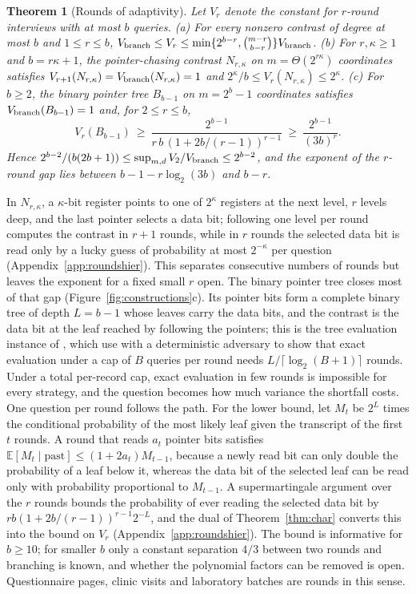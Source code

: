\documentclass{article}
\newtheorem{theorem}{Theorem}
\newcommand{\E}{\mathbb{E}}
\begin{document}
\begin{theorem}[Rounds of adaptivity]\label{thm:rounds}
Let $V_r$ denote the constant for $r$-round interviews with at most $b$ queries.
\textup{(a)} For every nonzero contrast of degree at most $b$ and $1\le r\le b$,
$V_{\rm branch}\le V_r\le\min\{2^{b-r},\binom{m-r}{b-r}\}V_{\rm branch}$.
\textup{(b)} For $r,\kappa\ge1$ and $b=r\kappa+1$, the pointer-chasing contrast $N_{r,\kappa}$ on $m=\Theta(2^{r\kappa})$ coordinates satisfies $V_{r+1}(N_{r,\kappa})=V_{\rm branch}(N_{r,\kappa})=1$ and $2^\kappa/b\le V_r(N_{r,\kappa})\le2^\kappa$.
\textup{(c)} For $b\ge2$, the binary pointer tree $B_{b-1}$ on $m=2^b-1$ coordinates satisfies $V_{\rm branch}(B_{b-1})=1$ and, for $2\le r\le b$,
\[
 V_r(B_{b-1})\ \ge\ \frac{2^{b-1}}{r\,b\,(1+2b/(r-1))^{r-1}}\ \ge\ \frac{2^{b-1}}{(3b)^r}.
\]
Hence $2^{b-2}/(b(2b+1))\le\sup_{m,d}V_2/V_{\rm branch}\le2^{b-2}$, and the exponent of the $r$-round gap lies between $b-1-r\log_2(3b)$ and $b-r$.
\end{theorem}

In $N_{r,\kappa}$, a $\kappa$-bit register points to one of $2^\kappa$ registers at the next level, $r$ levels deep, and the last pointer selects a data bit; following one level per round computes the contrast in $r+1$ rounds, while in $r$ rounds the selected data bit is read only by a lucky guess of probability at most $2^{-\kappa}$ per question (Appendix~\ref{app:roundshier}). This separates consecutive numbers of rounds but leaves the exponent for a fixed small $r$ open. The binary pointer tree closes most of that gap (Figure~\ref{fig:constructions}c). Its pointer bits form a complete binary tree of depth $L=b-1$ whose leaves carry the data bits, and the contrast is the data bit at the leaf reached by following the pointers; this is the tree evaluation instance of \citet{cook2012}, which \citet{li2026regex} use with a deterministic adversary to show that exact evaluation under a cap of $B$ queries per round needs $L/\lceil\log_2(B+1)\rceil$ rounds. Under a total per-record cap, exact evaluation in few rounds is impossible for every strategy, and the question becomes how much variance the shortfall costs. One question per round follows the path. For the lower bound, let $M_t$ be $2^{L}$ times the conditional probability of the most likely leaf given the transcript of the first $t$ rounds. A round that reads $a_t$ pointer bits satisfies $\E[M_t\mid\text{past}]\le(1+2a_t)M_{t-1}$, because a newly read bit can only double the probability of a leaf below it, whereas the data bit of the selected leaf can be read only with probability proportional to $M_{t-1}$. A supermartingale argument over the $r$ rounds bounds the probability of ever reading the selected data bit by $rb(1+2b/(r-1))^{r-1}2^{-L}$, and the dual of Theorem~\ref{thm:char} converts this into the bound on $V_r$ (Appendix~\ref{app:roundshier}). The bound is informative for $b\ge10$; for smaller $b$ only a constant separation $4/3$ between two rounds and branching is known, and whether the polynomial factors can be removed is open. Questionnaire pages, clinic visits and laboratory batches are rounds in this sense.
\end{document}
